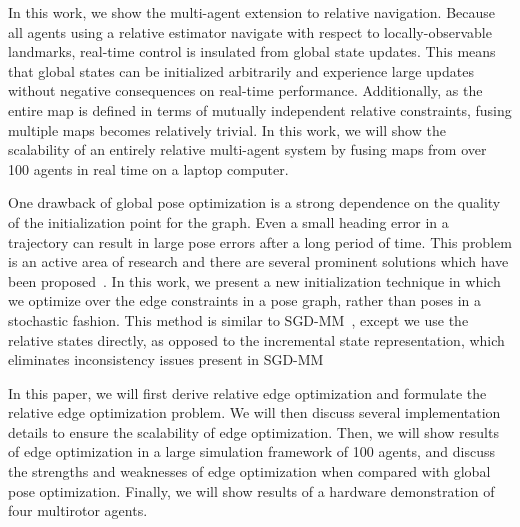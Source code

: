 In this work, we show the multi-agent extension to relative navigation.  Because all agents using a relative estimator navigate with respect to locally-observable landmarks, real-time control is insulated from global state updates.  This means that global states can be initialized arbitrarily and experience large updates without negative consequences on real-time performance. Additionally, as the entire map is defined in terms of mutually independent relative constraints, fusing multiple maps becomes relatively trivial.  In this work, we will show the scalability of an entirely relative multi-agent system by fusing maps from over 100 agents in real time on a laptop computer.

One drawback of global pose optimization is a strong dependence on the quality of the initialization point for the graph.  Even a small heading error in a trajectory can result in large pose errors after a long period of time.  This problem is an active area of research and there are several prominent solutions which have been proposed~\cite{Carlone2015, Kim2010a, Agarwal2014, Wang2014}.  In this work, we present a new initialization technique in which we optimize over the edge constraints in a pose graph, rather than poses in a stochastic fashion. This method is similar to SGD-MM~\cite{Wang2014}, except we use the relative states directly, as opposed to the incremental state representation, which eliminates inconsistency issues present in SGD-MM~\cite{PAPER}

In this paper, we will first derive relative edge optimization and formulate the relative edge optimization problem.  We will then discuss several implementation details to ensure the scalability of edge optimization.  Then, we will show results of edge optimization in a large simulation framework of 100 agents, and discuss the strengths and weaknesses of edge optimization when compared with global pose optimization.  Finally, we will show results of a hardware demonstration of four multirotor agents.
